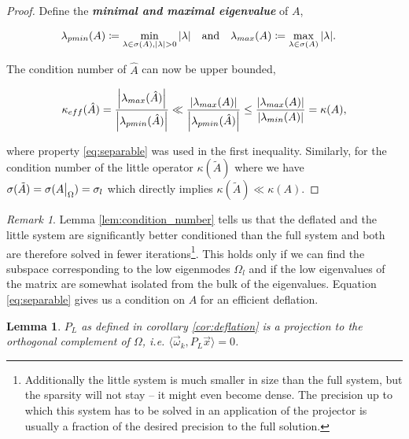 \documentclass{article}
\newcommand\restr[2]{{%
  \left.\kern-\nulldelimiterspace %
  #1 %
  \vphantom{\big|} %
  \right|_{#2} %
  }
}
\theoremstyle{plain} %
\newtheorem{lemma}[theorem]{Lemma}
\theoremstyle{convention} %
\theoremstyle{remark} %
\newtheorem*{remark}{Remark} %
\def\df#1{\textbf{\textit{#1}}}
\numberwithin{equation}{section}
\begin{document}
\begin{proof}
Define the \df{minimal and maximal eigenvalue} of $A$,

\begin{align*}
    \lambda_{pmin}(A) &\coloneqq \min\limits_{\lambda \in \sigma(A), \abs{\lambda} > 0} \abs{\lambda}
    & &\text{and} &
    \lambda_{max}(A) &\coloneqq \max\limits_{\lambda \in \sigma(A)} \abs{\lambda}.
\end{align*}

The condition number of $\hat{A}$ can now be upper bounded,

\begin{align*}
    \kappa_{eff}({\hat{A}}) = \frac{\abs{\lambda_{max}(\hat{A})}}{\abs{\lambda_{pmin}(\hat{A})}} \ll \frac{\abs{\lambda_{max}(A)}}{\abs{\lambda_{pmin}(\hat{A})}} \le \frac{\abs{\lambda_{max}(A)}}{\abs{\lambda_{min}(A)}} = \kappa({A}),
\end{align*}

where property \eqref{eq:separable} was used in the first inequality. Similarly, for the condition number of the little operator $\kappa({\tilde{A}})$ where we have $\sigma(\tilde{A}) = \sigma(\restr{A}{\Omega}) = \sigma_l$ which directly implies $\kappa(\tilde{A}) \ll \kappa(A)$.

\end{proof}

\begin{remark}
Lemma \ref{lem:condition_number} tells us that the deflated and the little system are significantly better conditioned than the full system and both are therefore solved in fewer iterations\footnote{Additionally the little system is much smaller in size than the full system, but the sparsity will not stay -- it might even become dense. The precision up to which this system has to be solved in an application of the projector is usually a fraction of the desired precision to the full solution.}. This holds only if we can find the subspace corresponding to the low eigenmodes $\Omega_l$ and if the low eigenvalues of the matrix are somewhat isolated from the bulk of the eigenvalues. Equation \eqref{eq:separable} gives us a condition on $A$ for an efficient deflation.
\end{remark}

\begin{lemma}

$P_L$ as defined in corollary \ref{cor:deflation} is a projection to the orthogonal complement of $\Omega$, i.e. $\langle \vec{\omega}_k, P_L \vec{x} \rangle = 0$.

\end{lemma}
\end{document}
